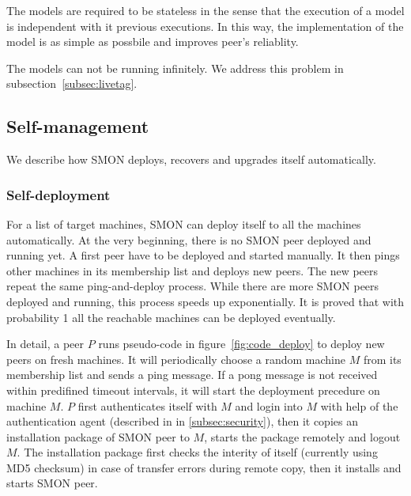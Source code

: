 {The models are required to be stateless in the sense that
the execution of a model is independent with it previous
executions. In this way, the implementation of the model is
as simple as possbile and improves peer's reliablity.



The models can not be running infinitely. We address this
problem in subsection~\ref{subsec:livetag}.
}

\subsection{Self-management}

We describe how SMON deploys, recovers and upgrades itself
automatically.

\subsubsection*{Self-deployment}

For a list of target machines, SMON can deploy itself to all
the machines automatically. At the very beginning, there is
no SMON peer deployed and running yet. A first peer have to
be deployed and started manually. It then pings other
machines in its membership list and deploys new peers. The
new peers repeat the same ping-and-deploy process. While
there are more SMON peers deployed and running, this process
speeds up exponentially. It is proved that with probability
1 all the reachable machines can be deployed
eventually\cite{Eugster2004}.

In detail, a peer $P$ runs pseudo-code in
figure~\ref{fig:code_deploy} to deploy new peers on fresh
machines. It will periodically choose a random machine $M$
from its membership list and sends a ping message. If a pong
message is not received within predifined timeout intervals,
it will start the deployment precedure on machine $M$. $P$
first authenticates itself with $M$ and login into $M$ with
help of the authentication agent (described in in
\ref{subsec:security}), then it copies an installation
package of SMON peer to $M$, starts the package remotely and
logout $M$. The installation package first checks the
interity of itself (currently using MD5 checksum) in case of
transfer errors during remote copy, then it installs and
starts SMON peer.


